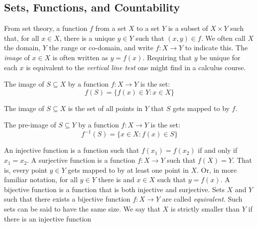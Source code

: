         \subsection{Sets, Functions, and Countability}
            From set theory, a function $f$ from a set $X$ to a
            set $Y$ is a subset of $X\times{Y}$ such that, for
            all $x\in{X}$, there is a unique $y\in{Y}$
            such that $(x,y)\in{f}$. We often call $X$ the
            domain, $Y$ the range or co-domain, and write
            $f:X\rightarrow{Y}$ to indicate this. The
            \textit{image} of $x\in{X}$ is often written
            as $y=f(x)$. Requiring that $y$ be unique for each
            $x$ is equivalent to the \textit{vertical line test}
            one might find in a calculus course.
            \begin{definition}
                The image of $S\subseteq{X}$
                by a function $f:X\rightarrow{Y}$
                is the set:
                \begin{equation}
                    f(S)=\{f(x)\in{Y}:x\in{X}\}
                \end{equation}
            \end{definition}
            The image of $S\subseteq{X}$ is the set of all
            points in $Y$ that $S$ gets mapped to by $f$.
            \begin{definition}
                The pre-image of $S\subseteq{Y}$ by a function
                $f:X\rightarrow{Y}$ is the set:
                \begin{equation}
                    f^{-1}(S)=\{x\in{X}:f(x)\in{S}\}
                \end{equation}
            \end{definition}
            An injective function is a function such
            that $f(x_{1})=f(x_{2})$ if and only if $x_{1}=x_{2}$.
            A surjective function is a function $f:X\rightarrow{Y}$
            such that $f(X)=Y$. That is, every point $y\in{Y}$
            gets mapped to by at least one point in $X$. Or, in
            more familiar notation, for all $y\in{Y}$ there is
            and $x\in{X}$ such that $y=f(x)$. A bijective
            function is a function that is both injective and
            surjective. Sets $X$ and $Y$ such that there
            exists a bijective function $f:X\rightarrow{Y}$ are
            called \textit{equivalent}. Such sets can be said
            to have the same size. We say that $X$ is strictly
            smaller than $Y$ if there is an injective function
